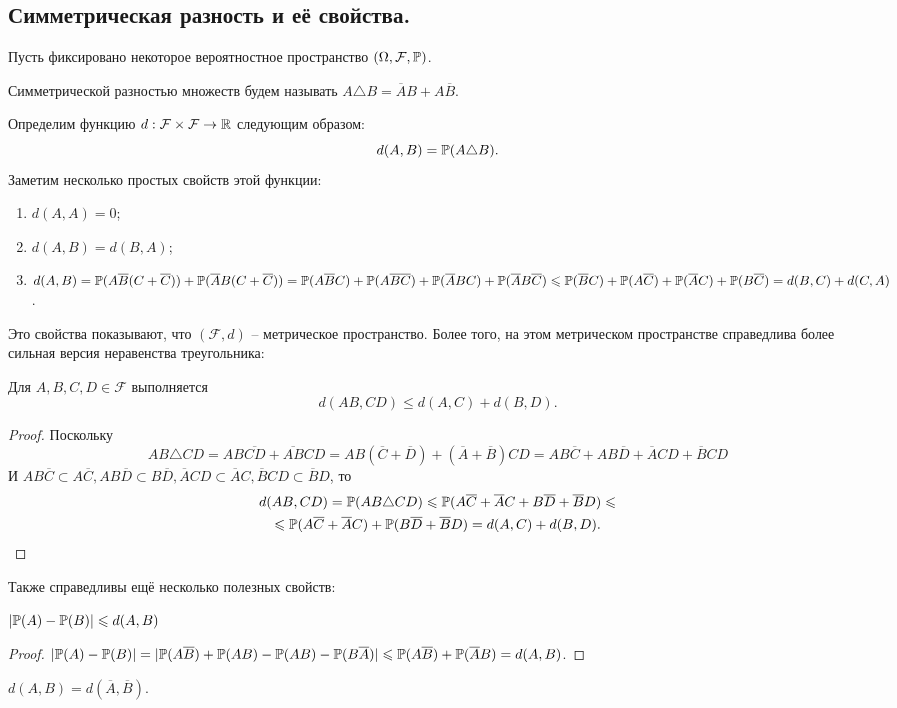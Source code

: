 \subsection{Симметрическая разность и её свойства.}
Пусть фиксировано некоторое вероятностное пространство $(\Omega, \mathcal{F}, \P)$.
\begin{definition}
    Симметрической разностью множеств будем называть $A \triangle B = \overline{A}B + A\overline{B}$.
\end{definition}
Определим функцию $d: \mathcal{F} \times \mathcal{F} \to \R$ следующим образом:
\[
    d(A, B) = \P(A \triangle B).
\]
Заметим несколько простых свойств этой функции:
\begin{enumerate}
    \item $d(A, A) = 0$;
    \item $d(A, B) = d(B, A)$;
    \item $d(A, B) = \P(A \overline{B}(C + \overline{C})) + \P(\overline{A}B(C + \overline{C}))  = \P(A\overline{B}C) + \P(A\overline{B}\overline{C}) + \P(\overline{A}BC) + \P(\overline{A}B\overline{C}) \leq \P(\overline{B}C) + \P(A\overline{C}) + \P(\overline{A}C) + \P(B\overline{C}) = d(B, C) + d(C, A)$.
\end{enumerate}
Это свойства показывают, что $(\mathcal{F}, d)$ -- метрическое пространство. Более того, на этом метрическом пространстве справедлива более сильная версия неравенства треугольника:
\begin{lemma}
    Для $A, B, C, D \in \mathcal{F}$ выполняется
    \[
        d(AB, CD) \leq d(A, C) + d(B, D).
    \]
\end{lemma}
\begin{proof}
    Поскольку \[AB\triangle CD = AB \overline{CD} + \overline{AB}CD = AB(\overline{C} + \overline{D}) + (\overline{A} + \overline{B})CD = AB\overline{C} + AB\overline{D} + \overline{A}CD + \overline{B}CD\]
    И $AB\overline{C} \subset A\overline{C}, AB\overline{D} \subset B\overline{D}, \overline{A}CD \subset \overline{A}C, \overline{B}CD \subset \overline{B}D$, то 
    \begin{multline*}
        d(AB, CD) = \P(AB \triangle CD) \leq \P(A\overline{C} + \overline{A}C + B\overline{D} + \overline{B}D) \leq \\ \leq \P(A\overline{C} + \overline{A}C) + \P(B\overline{D} + \overline{B}D) = d(A, C) + d(B, D).
    \end{multline*}
\end{proof}
Также справедливы ещё несколько полезных свойств:
\begin{property}
    $|\P(A) - \P(B)| \leq d(A, B)$
\end{property}
\begin{proof}
    $|\P(A) - \P(B)| = |\P(A\overline{B}) + \P(AB) - \P(AB) - \P(B \overline{A})| \leq \P(A\overline{B}) + \P(\overline{A}B) = d(A, B)$.
\end{proof}
\begin{property}
    $d(A, B) = d(\overline{A}, \overline{B})$.
\end{property}
